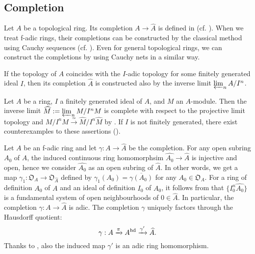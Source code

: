 \subsection{Completion}


Let $A$ be a topological ring. 
Its completion $A \to \widehat{A}$ 
is defined in \cite[Ch II \S 3 Section 3, Ch. III \S 6 Sect. 3]{Bou89} 
(cf. \cite[Ch. 0, Section 7.1(c)]{FK}). 
When we treat f-adic rings, 
their completions can be constructed 
by the classical method using Cauchy sequences 
(cf. \cite[Section 10.1]{AM69}). 
Even for general topological rings, 
we can construct the completions by using Cauchy nets in a similar way. 

If the topology of $A$ coincides with the $I$-adic topology for some finitely generated ideal $I$, 
then its completion $\widehat{A}$ is constructed 
also by the inverse limit $\varprojlim_n A/I^n$. 

\begin{rem}
Let $A$ be a ring, $I$ a finitely generated ideal of $A$, and $M$ an $A$-module. 
Then the inverse limit $\widehat{M}:=\varprojlim_n M/I^nM$ is complete 
with respect to the projective limit topology and $M/I^nM \xrightarrow{\simeq} \widehat{M}/I^n\widehat{M}$ 
by \cite[Ch. 0, Lemma 7.2.8 and Proposition 7.2.16]{FK}. 
If $I$ is not finitely generated, 
there exist counterexamples to these assertions (\cite[Ch. 0, Example 7.2.10]{FK}). 
\end{rem}



Let $A$ be an f-adic ring and let $\gamma:A \to \widehat{A}$ be the completion. 
For any open subring $A_0$ of $A$, 
the induced continuous ring homomorphsim $\widehat{A_0} \to \widehat{A}$ 
is injective and open, hence we consider $\widehat{A_0}$ 
as an open subring of $\widehat{A}$. 
In other words, we get a map 
$\gamma_1:\mathfrak O_A \to \mathfrak O_{\widehat{A}}$ 
defined by $\gamma_1(A_0)=\overline{\gamma(A_0)}$ for any $A_0 \in \mathfrak O_A$. 
For a ring of definition $A_0$ of $A$ and 
an ideal of definition $I_0$ of $A_0$, 
it follows from \cite[Lemma 1.6(i)]{Hub93} that $\{I_0^n\widehat{A_0}\}$ 
is a fundamental system of open neighbourhoods of $0 \in \widehat{A}$. 
In particular, 
the completion $\gamma:A \to \widehat{A}$ is adic. 
The completion $\gamma$ uniquely factors through the Hausdorff quotient: 
$$\gamma:A \xrightarrow{\pi}  A^{{\operatorname{hd}}} \xrightarrow{\gamma'}\widehat{A}.$$
Thanks to \cite[Corollary 1.9(ii)]{Hub93}, 
also the induced map $\gamma'$ is an adic ring homomorphism. 




